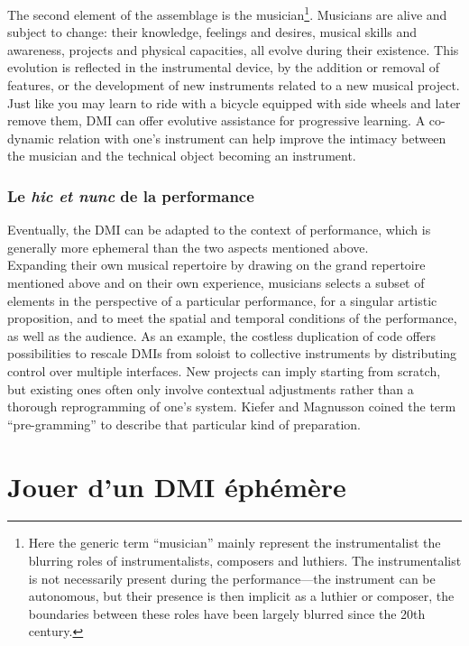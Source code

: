 The second element of the assemblage is the musician\footnote{Here the generic term “musician” mainly represent the instrumentalist the blurring roles of instrumentalists, composers and luthiers. The instrumentalist is not necessarily present during the performance—the instrument can be autonomous, but their presence is then implicit as a luthier or composer, the boundaries between these roles have been largely blurred since the 20th century.}. Musicians are alive and subject to change: their knowledge, feelings and desires, musical skills and awareness, projects and physical capacities, all evolve during their existence. This evolution is reflected in the instrumental device, by the addition or removal of features, or the development of new instruments related to a new musical project. Just like you may learn to ride with a bicycle equipped with side wheels and later remove them, DMI can offer evolutive assistance for progressive learning. A co-dynamic relation with one's instrument can help improve the intimacy between the musician and the technical object becoming an instrument.

\subsubsection{Le \textit{hic et nunc} de la performance}

Eventually, the DMI can be adapted to the context of performance, which is generally more ephemeral than the two aspects mentioned above.\\
\indent Expanding their own musical repertoire by drawing on the grand repertoire mentioned above and on their own experience, musicians selects a subset of elements in the perspective of a particular performance, for a singular artistic proposition, and to meet the spatial and temporal conditions of the performance, as well as the audience. As an example, the costless duplication of code offers possibilities to rescale DMIs from soloist to collective instruments by distributing control over multiple interfaces. New projects can imply starting from scratch, but existing ones often only involve contextual adjustments rather than a thorough reprogramming of one's system. Kiefer and Magnusson coined the term “pre-gramming” \cite{kiefer_live_2019} to describe that particular kind of preparation.
	

\section{Jouer d'un DMI éphémère}

